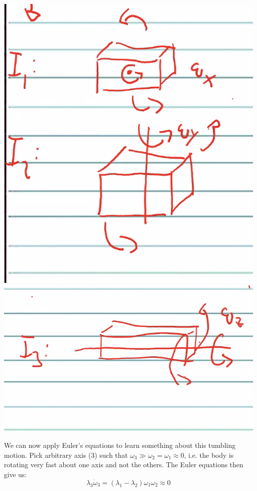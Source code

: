 \documentclass[../PHYS306Notes.tex]{subfiles}
\begin{document}
\begin{center}
    \includegraphics[scale=0.7]{Lecture-19/l19-img3.png}
    \includegraphics[scale=0.7]{Lecture-19/l19-img4.png}
\end{center}
We can now apply Euler's equations to learn something about this tumbling motion. Pick arbitrary axis (3) such that $\omega_3 \gg \omega_2 = \omega_1 \approx 0$, i.e. the body is rotating very fast about one axis and not the others. The Euler equations then give us:
\[\lambda_3\dot{\omega}_3 = (\lambda_1 - \lambda_2)\omega_1\omega_2 \approx 0\]
\end{document}
